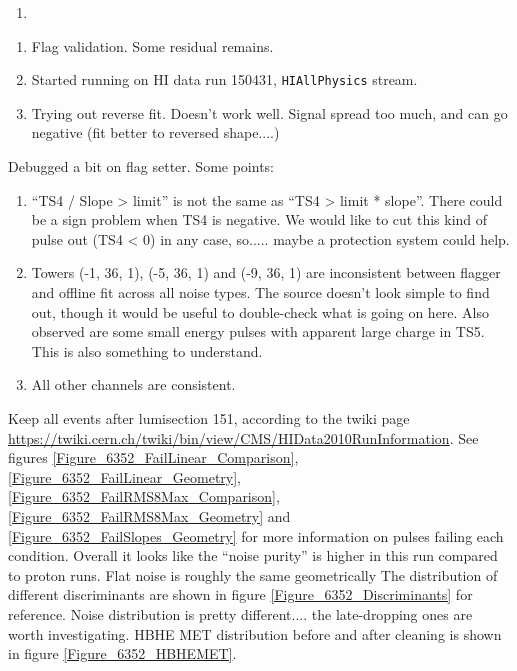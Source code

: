 

\begin{enumerate}
\item 
\end{enumerate}


\begin{enumerate}
\item Flag validation.  Some residual remains.
\item Started running on HI data run 150431, \texttt{HIAllPhysics} stream.
\item Trying out reverse fit.  Doesn't work well.  Signal spread too much, and can go negative (fit better to reversed shape....)
\end{enumerate}


Debugged a bit on flag setter.  Some points:

\begin{enumerate}
\item ``TS4 / Slope > limit'' is not the same as ``TS4 > limit * slope''.  There could be a sign problem when TS4 is negative.
We would like to cut this kind of pulse out (TS4 < 0) in any case, so..... maybe a protection system could help.
\item Towers (-1, 36, 1), (-5, 36, 1) and (-9, 36, 1) are inconsistent between flagger and offline fit across all noise types.
The source doesn't look simple to find out, though it would be useful to double-check what is going on here.
Also observed are some small energy pulses with apparent large charge in TS5.  This is also something to understand.
\item All other channels are consistent.
\end{enumerate}


Keep all events after lumisection 151, according to the twiki page \url{https://twiki.cern.ch/twiki/bin/view/CMS/HIData2010RunInformation}.
See figures \ref{Figure_6352_FailLinear_Comparison}, \ref{Figure_6352_FailLinear_Geometry}, \ref{Figure_6352_FailRMS8Max_Comparison},
\ref{Figure_6352_FailRMS8Max_Geometry} and \ref{Figure_6352_FailSlopes_Geometry} for more information on pulses failing each condition.
Overall it looks like the ``noise purity'' is higher in this run compared to proton runs.  Flat noise is roughly the same geometrically
The distribution of different discriminants are shown in figure \ref{Figure_6352_Discriminants} for reference.
Noise distribution is pretty different.... the late-dropping ones are worth investigating.
HBHE MET distribution before and after cleaning is shown in figure \ref{Figure_6352_HBHEMET}.

